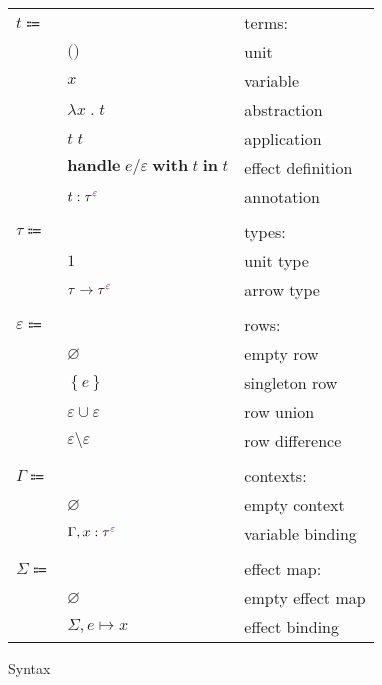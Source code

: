 \documentclass[12pt]{article}
\newcommand\anno[2]{#1 : #2}
\newcommand\term{t}
\newcommand\eUnit{\texttt{()}}
\newcommand\eVar{x}
\newcommand\eAbs[2]{\lambda #1 \; . \; #2}
\newcommand\eApp[2]{#1 \; #2}
\newcommand\eHandle[4]{\textbf{handle} \; #1 / #2 \; \textbf{with} \; #3 \; \textbf{in} \; #4}
\newcommand\eAnno[3]{\anno{#1}{\tEmbellished{#2}{#3}}}
\newcommand\type{\tau}
\newcommand\tUnit{1}
\newcommand\tArrow[3]{#1 \rightarrow \tEmbellished{#2}{#3}}
\newcommand\tEmbellished[2]{{#1}^{\textcolor{violet}{#2}}}
\newcommand\row{\varepsilon}
\newcommand\rEmpty{\varnothing}
\newcommand\rSingleton[1]{\left\{ #1 \right\}}
\newcommand\rUnion[2]{#1 \cup #2}
\newcommand\rDiff[2]{#1 \setminus #2}
\newcommand\context{\Gamma}
\newcommand\cEmpty{\varnothing}
\newcommand\cExtend[4]{#1, \anno{#2}{\tEmbellished{#3}{#4}}}
\newcommand\effect{e}
\newcommand\effectMap{\Sigma}
\newcommand\emMap[2]{#1 \mapsto #2}
\newcommand\emEmpty{\varnothing}
\newcommand\emExtend[3]{#1, \emMap{#2}{#3}}
\begin{document}
      \begin{figure}[H]
        \begin{mdframed}[backgroundcolor=none]
          \begin{center}
            \begin{tabular}{l l l}
              $\term \Coloneqq$ & & terms: \\
              & $\eUnit$ & unit \\
              & $\eVar$ & variable \\
              & $\eAbs{\eVar}{\term}$ & abstraction \\
              & $\eApp{\term}{\term}$ & application \\
              & $\eHandle{\effect}{\row}{\term}{\term}$ & effect definition \\
              & $\eAnno{\term}{\type}{\row}$ & annotation \\
              \\
              $\type \Coloneqq$ & & types: \\
              & $\tUnit$ & unit type \\
              & $\tArrow{\type}{\type}{\row}$ & arrow type \\
              \\
              $\row \Coloneqq$ & & rows: \\
              & $\rEmpty$ & empty row \\
              & $\rSingleton{\effect}$ & singleton row \\
              & $\rUnion{\row}{\row}$ & row union \\
              & $\rDiff{\row}{\row}$ & row difference \\
              \\
              $\context \Coloneqq$ & & contexts: \\
              & $\cEmpty$ & empty context \\
              & $\cExtend{\context}{\eVar}{\type}{\row}$ & variable binding \\
              \\
              $\effectMap \Coloneqq$ & & effect map: \\
              & $\emEmpty$ & empty effect map \\
              & $\emExtend{\effectMap}{\effect}{\eVar}$ & effect binding \\
            \end{tabular}
          \end{center}

          \caption{Syntax}\label{fig:syntax}
        \end{mdframed}
      \end{figure}
\end{document}
